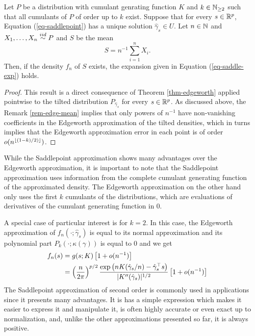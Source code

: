 \begin{theorem}
    Let $P$ be a distribution with cumulant genrating function $K$ and $k \in \mathbb{N}_{\geq 2}$ such that all cumulants of $P$ of order up to $k$ exist. Suppose that for every $s \in {\mathbb{R}^p}$, Equation (\ref{eq-saddlepoint}) has a unique solution $\hat\gamma_s \in U$. Let $n \in \mathbb{N}$ and $X_1, \ldots, X_n \stackrel{iid}{\sim} P$ and $S$ be the mean
    \begin{equation*}
        S = n^{-1} \sum_{i=1}^n X_i.
    \end{equation*}
    Then, if the density $f_n$ of $S$ exists, the expansion given in Equation (\ref{eq-saddle-exp}) holds.
\end{theorem}
\begin{proof}
    This result is a direct consequence of Theorem \ref{thm-edgeworth} applied pointwise to the tilted distribution $P_{\hat\gamma_s}$ for every $s \in {\mathbb{R}^p}$. As discussed above, the Remark \ref{rem-edge-mean} implies that only powers of $n^{-1}$ have non-vanishing coefficients in the Edgeworth approximation of the tilted densities, which in turns implies that the Edgeworth approximation error in each point is of order $o(n^{\lfloor(1-k)/2)\rfloor})$.
\end{proof}

While the Saddlepoint approximation shows many advantages over the Edgeworth approximation, it is important to note that the Saddlepoint approximation uses information from the complete cumulant generating function of the approximated density. The Edgeworth approximation on the other hand only uses the first $k$ cumulants of the distributions, which are evaluations of derivatives of the cumulant generating function in 0. 

A special case of particular interest is for $k = 2$. In this case, the Edgeworth approximation of $f_n(\cdot; \hat\gamma_s)$ is equal to its normal approximation and its polynomial part $P_k(\cdot; \kappa(\gamma))$ is equal to 0 and we get 
\begin{align} \label{eq-saddle-3}
    f_n(s) &= g(s; K)\left[1 + o(n^{-1})\right]\nonumber\\
    &= \left(\frac{n}{2\pi}\right)^{p/2} \frac{\exp\left(nK(\hat\gamma_s / n) - \hat\gamma_s^\top s\right)}{|K''(\hat\gamma_s)|^{1/2}} \left[1 + o(n^{-1})\right]
\end{align}
The Saddlepoint approximation of second order is commonly used in applications since it presents many advantages. It is has a simple expression which makes it easier to express it and manipulate it, is often highly accurate or even exact up to normalization, and, unlike the other approximations presented so far, it is always positive.

